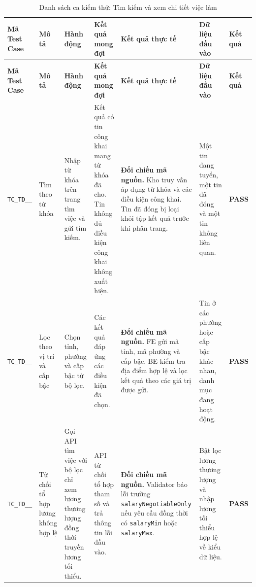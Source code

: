 \begin{landscape}
{
\fontsize{9.5}{11.5}\selectfont
\setlength{\tabcolsep}{3pt}
\renewcommand{\arraystretch}{1.2}
\begin{longtable}{|>{\raggedright\arraybackslash}p{2.1cm}|>{\raggedright\arraybackslash}p{2.8cm}|>{\raggedright\arraybackslash}p{3.8cm}|>{\raggedright\arraybackslash}p{4.0cm}|>{\raggedright\arraybackslash}p{5.0cm}|>{\raggedright\arraybackslash}p{3.2cm}|>{\centering\arraybackslash}p{1.3cm}|}
    \caption{Danh sách ca kiểm thử: Tìm kiếm và xem chi tiết việc làm} \label{tab:ts-td-01} \\
    \hline
    \textbf{Mã Test Case} & \textbf{Mô tả} & \textbf{Hành động} & \textbf{Kết quả mong đợi} & \textbf{Kết quả thực tế} & \textbf{Dữ liệu đầu vào} & \textbf{Kết quả} \\
    \hline
    \endfirsthead
    \hline
    \textbf{Mã Test Case} & \textbf{Mô tả} & \textbf{Hành động} & \textbf{Kết quả mong đợi} & \textbf{Kết quả thực tế} & \textbf{Dữ liệu đầu vào} & \textbf{Kết quả} \\
    \hline
    \endhead
    \hline
    \endfoot
    \hline
    \endlastfoot
    \texttt{TC\_\allowbreak TD\_\allowbreak 01\_\allowbreak 01} & Tìm theo từ khóa & Nhập từ khóa trên trang tìm việc và gửi tìm kiếm. & Kết quả có tin công khai mang từ khóa đã cho. Tin không đủ điều kiện công khai không xuất hiện. & \textbf{Đối chiếu mã nguồn.} Kho truy vấn áp dụng từ khóa và các điều kiện công khai. Tin đã đóng bị loại khỏi tập kết quả trước khi phân trang. & Một tin đang tuyển, một tin đã đóng và một tin không liên quan. & \textbf{PASS} \\
    \hline
    \texttt{TC\_\allowbreak TD\_\allowbreak 01\_\allowbreak 02} & Lọc theo vị trí và cấp bậc & Chọn tỉnh, phường và cấp bậc từ bộ lọc. & Các kết quả đáp ứng các điều kiện đã chọn. & \textbf{Đối chiếu mã nguồn.} FE gửi mã tỉnh, mã phường và cấp bậc. BE kiểm tra địa điểm hợp lệ và lọc kết quả theo các giá trị được gửi. & Tin ở các phường hoặc cấp bậc khác nhau, danh mục đang hoạt động. & \textbf{PASS} \\
    \hline
    \texttt{TC\_\allowbreak TD\_\allowbreak 01\_\allowbreak 03} & Từ chối tổ hợp lương không hợp lệ & Gọi API tìm việc với bộ lọc chỉ xem lương thương lượng đồng thời truyền lương tối thiểu. & API từ chối tổ hợp tham số và trả thông tin lỗi đầu vào. & \textbf{Đối chiếu mã nguồn.} Validator báo lỗi trường \texttt{salaryNegotiableOnly} nếu yêu cầu đồng thời có \texttt{salaryMin} hoặc \texttt{salaryMax}. & Bật lọc lương thương lượng và nhập lương tối thiểu hợp lệ về kiểu dữ liệu. & \textbf{PASS} \\

\end{longtable}}
\end{landscape}
